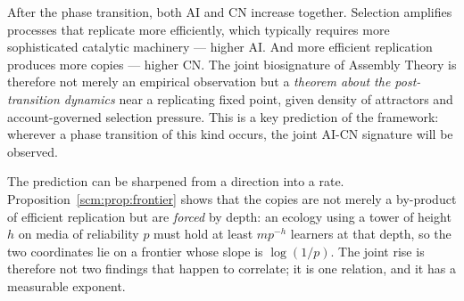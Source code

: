 \begin{remark}
\label{rmk:joint-rise}
After the phase transition, both $\mathrm{AI}$ and $\mathrm{CN}$
increase together.
Selection amplifies processes that replicate more efficiently,
which typically requires more sophisticated catalytic machinery
--- higher $\mathrm{AI}$.
And more efficient replication produces more copies --- higher
$\mathrm{CN}$.
The joint biosignature of Assembly Theory is therefore not merely
an empirical observation but a \emph{theorem about the
post-transition dynamics} near a replicating fixed point, given
density of attractors and account-governed selection pressure.
This is a key prediction of the framework: wherever a phase
transition of this kind occurs, the joint $\mathrm{AI}$-$\mathrm{CN}$
signature will be observed.

The prediction can be sharpened from a direction into a rate.
Proposition~\ref{scm:prop:frontier} shows that the copies are not
merely a by-product of efficient replication but are \emph{forced} by
depth: an ecology using a tower of height $h$ on media of reliability
$p$ must hold at least $m p^{-h}$ learners at that depth, so the two
coordinates lie on a frontier whose slope is $\log(1/p)$.
The joint rise is therefore not two findings that happen to
correlate; it is one relation, and it has a measurable exponent.
\end{remark}

